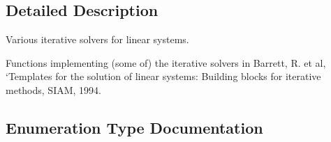 \subsection{Detailed Description}
Various iterative solvers for linear systems. 

Functions implementing (some of) the iterative solvers in Barrett, R. et al, `\+Templates for the solution of linear systems\+: Building blocks for iterative methods\textquotesingle{}, S\+I\+A\+M, 1994. 

\subsection{Enumeration Type Documentation}
\hypertarget{group__solver_ga1db83bd06f9de0d0a3375f66a57d8f7b}{}
